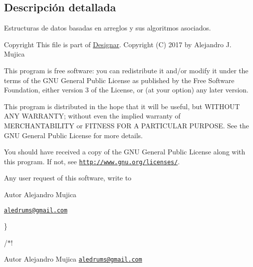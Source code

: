 \subsection{Descripción detallada}
Estructuras de datos basadas en arreglos y sus algoritmos asociados. 

\begin{DoxyCopyright}{Copyright}
This file is part of \hyperlink{namespace_designar}{Designar}. Copyright (C) 2017 by Alejandro J. Mujica
\end{DoxyCopyright}
This program is free software\+: you can redistribute it and/or modify it under the terms of the G\+NU General Public License as published by the Free Software Foundation, either version 3 of the License, or (at your option) any later version.

This program is distributed in the hope that it will be useful, but W\+I\+T\+H\+O\+UT A\+NY W\+A\+R\+R\+A\+N\+TY; without even the implied warranty of M\+E\+R\+C\+H\+A\+N\+T\+A\+B\+I\+L\+I\+TY or F\+I\+T\+N\+E\+SS F\+OR A P\+A\+R\+T\+I\+C\+U\+L\+AR P\+U\+R\+P\+O\+SE. See the G\+NU General Public License for more details.

You should have received a copy of the G\+NU General Public License along with this program. If not, see \href{http://www.gnu.org/licenses/}{\tt http\+://www.\+gnu.\+org/licenses/}.

Any user request of this software, write to

\begin{DoxyAuthor}{Autor}
Alejandro Mujica
\end{DoxyAuthor}
\href{mailto:aledrums@gmail.com}{\tt aledrums@gmail.\+com}

\}

/$\ast$!

\begin{DoxyAuthor}{Autor}
Alejandro Mujica \href{mailto:aledrums@gmail.com}{\tt aledrums@gmail.\+com} 
\end{DoxyAuthor}
